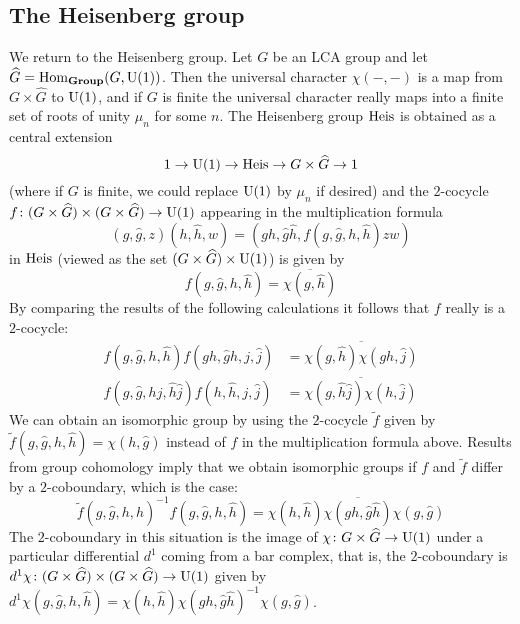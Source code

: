 \documentclass[../../rtnotes.tex]{subfiles}
\begin{document}
\subsection{The Heisenberg group}
We return to the Heisenberg group. Let $G$ be an LCA group and let $\widehat G = \operatorname{Hom}_{{\normalfont\mathbf{Group}}}(G,\operatorname{U}(1))$. Then the universal character $\chi(-,-)$ is a map from $G\times \widehat G$ to $\operatorname{U}(1)$, and if $G$ is finite the universal character really maps into a finite set of roots of unity $\mu_n$ for some $n$. The Heisenberg group $\operatorname{Heis}$ is obtained as a central extension 
\[1\to \operatorname{U}(1)\to \operatorname{Heis}\to G\times \widehat G\to 1\]
(where if $G$ is finite, we could replace $\operatorname{U}(1)$ by $\mu_n$ if desired) and the $2$-cocycle $f\colon (G\times \widehat G)\times (G\times \widehat G)\to \operatorname{U}(1)$ appearing in the multiplication formula
\[(g,\hat g, z)(h,\hat h,w) = (gh,\hat g\hat h,f(g,\hat g,h,\hat h)zw)\]
in $\operatorname{Heis}$ (viewed as the set $(G\times \widehat G)\times \operatorname{U}(1)$) is given by 
\[f(g,\hat g,h,\hat h) = \overline{\chi(g,\hat h)}\]
By comparing the results of the following calculations it follows that $f$ really is a $2$-cocycle:
\begin{align*}
    f(g,\hat g,h,\hat h)f(gh,\hat g\hat h,j,\hat j) &= \overline{\chi(g,\hat h)\chi(gh,\hat j)}\\
    f(g,\hat g,hj,\hat h \hat j)f(h,\hat h,j,\hat j) &= \overline{\chi(g,\hat h\hat j)\chi(h,\hat j)}
\end{align*}
We can obtain an isomorphic group by using the $2$-cocycle $\tilde f$ given by $\tilde f(g,\hat g,h,\hat h) = \chi(h,\hat g)$ instead of $f$ in the multiplication formula above. Results from group cohomology imply that we obtain isomorphic groups if $f$ and $\tilde f$ differ by a $2$-coboundary, which is the case:
\[\tilde f(g,\hat g,h,\hat h)^{-1} f(g,\hat g,h,\hat h) = \chi(h,\hat h)\overline{\chi(gh,\hat g\hat h)}\chi(g,\hat g)\]
The $2$-coboundary in this situation is the image of $\chi \colon G\times \widehat G\to \operatorname{U}(1)$ under a particular differential $d^1$ coming from a bar complex, that is, the $2$-coboundary is $d^1\chi \colon (G\times \widehat G)\times (G\times \widehat G)\to \operatorname{U}(1)$ given by $d^1\chi(g,\hat g,h,\hat h) = \chi(h,\hat h)\chi(gh,\hat g\hat h)^{-1}\chi(g,\hat g)$.
\end{document}
